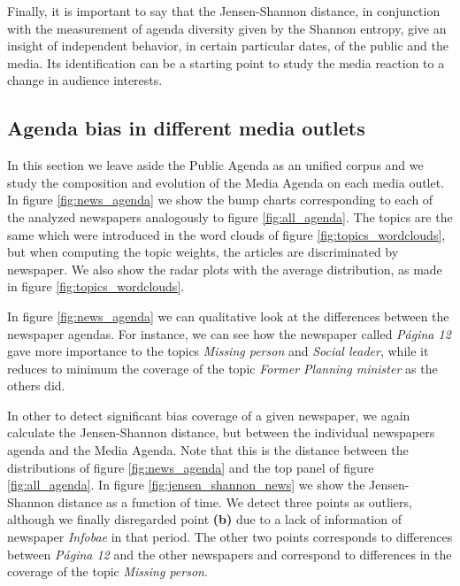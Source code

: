 \documentclass{bmcart}
\begin{document}
\par %
Finally, it is important to say that the Jensen-Shannon distance, in conjunction with the measurement of agenda diversity given by the Shannon entropy, give an insight of independent behavior, in certain particular dates,  of the public and the media. Its identification can be a starting point to study the media reaction to a change in audience interests.
 
\subsection*{Agenda bias in different media outlets}

\par In this section we leave aside the Public Agenda as an unified corpus and we study the composition and evolution of the Media Agenda on each media outlet. 
In figure \ref{fig:news_agenda} we show the bump charts corresponding to each of the analyzed newspapers analogously to figure \ref{fig:all_agenda}.
The topics are the same which were introduced in the word clouds of figure \ref{fig:topics_wordclouds}, but when computing the topic weights, the articles are discriminated by newspaper. 
We also show the radar plots with the average distribution, as made in figure \ref{fig:topics_wordclouds}. 

\par In figure \ref{fig:news_agenda} we can qualitative look at the differences between the newspaper agendas.
For instance, we can see how the newspaper called \emph{P\'agina 12} gave more importance to the topics \emph{Missing person} and \emph{Social leader}, while it reduces to minimum the coverage of the topic  \emph{Former Planning minister} as the others did.

\par In other to detect significant bias coverage of a given newspaper, we again calculate the Jensen-Shannon distance, but between the individual newspapers agenda and the Media Agenda.
Note that this is the distance between the distributions of figure \ref{fig:news_agenda} and the top panel of figure \ref{fig:all_agenda}. 
 In figure \ref{fig:jensen_shannon_news} we show the Jensen-Shannon distance as a function of time.
We detect three points as outliers, although we finally disregarded point \textbf{(b)} due to a lack of  information of newspaper \emph{Infobae} in that period. 
The other two points corresponds to differences between \emph{P\'agina 12} and the other newspapers and correspond to differences in the coverage of the topic \emph{Missing person}.
\end{document}
